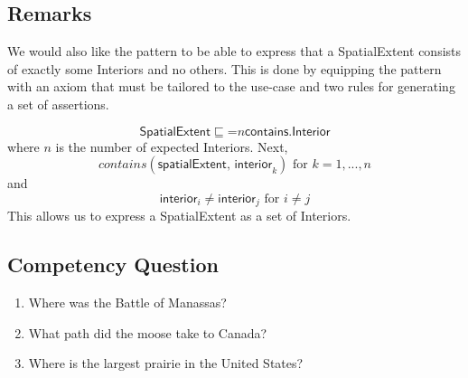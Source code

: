\subsection{Remarks}
\label{rem:Spatial}
We would also like the pattern to be able to express that a \textsf{SpatialExtent} consists of exactly some \textsf{Interiors} and no others. This is done by equipping the pattern with an axiom that must be tailored to the use-case and two rules for generating a set of assertions.

\begin{equation}
\textsf{SpatialExtent} \sqsubseteq \mathord{=}n\textsf{contains.Interior}
\end{equation}
where $n$ is the number of expected \textsf{Interiors}. Next,
$$\textit{contains}(\textsf{spatialExtent, interior}_k) \text{ for } k=1,...,n$$
and
$$\textsf{interior}_i \not = \textsf{interior}_j \text{ for } i \not = j$$
This allows us to express a \textsf{SpatialExtent} as a set of \textsf{Interiors}.
\subsection{Competency Question}
\label{cqs:Spatial}
\begin{enumerate}[CQ1.]
\item Where was the Battle of Manassas?
\item What path did the moose take to Canada?
\item Where is the largest prairie in the United States?
\end{enumerate}

\newpage
